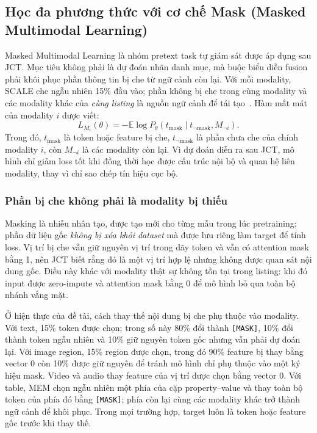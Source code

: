 \documentclass[10pt,conference]{IEEEtran}
\begin{document}
\subsection{Học đa phương thức với cơ chế Mask (Masked Multimodal Learning)}

Masked Multimodal Learning là nhóm pretext task tự giám sát được áp dụng sau JCT. Mục tiêu không phải là dự đoán nhãn danh mục, mà buộc biểu diễn fusion phải khôi phục phần thông tin bị che từ ngữ cảnh còn lại. Với mỗi modality, SCALE che ngẫu nhiên 15\% đầu vào; phần không bị che trong cùng modality và các modality khác của \emph{cùng listing} là nguồn ngữ cảnh để tái tạo~\cite{dong2022m5product}. Hàm mất mát của modality $i$ được viết:
\begin{equation}
L_{M_i}(\theta)
=
-\mathbb{E}
\log P_\theta
(t_{\mathrm{mask}}
\mid
t_{\neg\mathrm{mask}},M_{\neg i}).
\end{equation}
Trong đó, $t_{\mathrm{mask}}$ là token hoặc feature bị che, $t_{\neg\mathrm{mask}}$ là phần chưa che của chính modality $i$, còn $M_{\neg i}$ là các modality còn lại. Vì dự đoán diễn ra sau JCT, mô hình chỉ giảm loss tốt khi đồng thời học được cấu trúc nội bộ và quan hệ liên modality, thay vì chỉ sao chép tín hiệu cục bộ.

\subsubsection{Phần bị che không phải là modality bị thiếu}

Masking là nhiễu nhân tạo, được tạo mới cho từng mẫu trong lúc pretraining; phần dữ liệu gốc \emph{không bị xóa khỏi dataset} mà được lưu riêng làm target để tính loss. Vị trí bị che vẫn giữ nguyên vị trí trong dãy token và vẫn có attention mask bằng 1, nên JCT biết rằng đó là một vị trí hợp lệ nhưng không được quan sát nội dung gốc. Điều này khác với modality thật sự không tồn tại trong listing: khi đó input được zero-impute và attention mask bằng 0 để mô hình bỏ qua toàn bộ nhánh vắng mặt.

Ở hiện thực của đề tài, cách thay thế nội dung bị che phụ thuộc vào modality. Với text, 15\% token được chọn; trong số này 80\% đổi thành \texttt{[MASK]}, 10\% đổi thành token ngẫu nhiên và 10\% giữ nguyên token gốc nhưng vẫn phải dự đoán lại. Với image region, 15\% region được chọn, trong đó 90\% feature bị thay bằng vector 0 còn 10\% được giữ nguyên để tránh mô hình chỉ phụ thuộc vào một ký hiệu mask. Video và audio thay feature của vị trí được chọn bằng vector 0. Với table, MEM chọn ngẫu nhiên một phía của cặp property--value và thay toàn bộ token của phía đó bằng \texttt{[MASK]}; phía còn lại cùng các modality khác trở thành ngữ cảnh để khôi phục. Trong mọi trường hợp, target luôn là token hoặc feature gốc trước khi thay thế.
\end{document}
